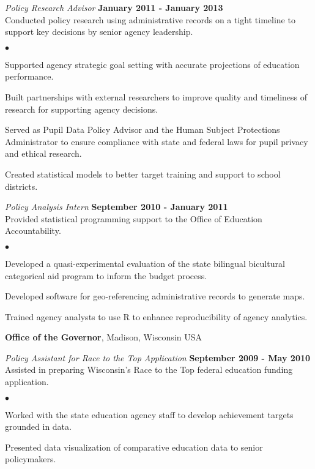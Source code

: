 \documentclass[margin,line]{res}
\newenvironment{list2}{
  \begin{list}{$\bullet$}{%
      \setlength{\itemsep}{0in}
      \setlength{\parsep}{0in} \setlength{\parskip}{0in}
      \setlength{\topsep}{0in} \setlength{\partopsep}{0in} 
      \setlength{\leftmargin}{0.2in}}}{\end{list}}
\begin{document}
\begin{resume}
\vspace*{-.3cm}
{\em Policy Research Advisor} \hfill {\bf January 2011 - January 2013} \\
Conducted policy research using administrative records on a tight timeline to 
support key decisions by senior agency leadership. \\

\vspace*{-2mm}

\begin{list2}
\item Supported agency strategic goal setting with accurate projections of education performance.
\item Built partnerships with external researchers to improve quality and 
timeliness of research for supporting agency decisions.
\item Served as Pupil Data Policy Advisor and the Human Subject Protections 
Administrator to ensure compliance with state and federal laws for pupil privacy 
and ethical research.
\item Created statistical models to better target training and support to school districts.
\end{list2}

\vspace{-.3cm}
{\em Policy Analysis Intern} \hfill {\bf September 2010 - January 2011}\\
Provided statistical programming support to the Office of Education Accountability.
\begin{list2}
\item Developed a quasi-experimental evaluation of the state bilingual bicultural 
categorical aid program to inform the budget process.
\item Developed software for geo-referencing administrative records to generate 
maps.
\item Trained agency analysts to use R to enhance reproducibility of agency analytics. 
\end{list2}
\vspace{-.1cm}

{\bf Office of the Governor}, Madison, Wisconsin USA

\vspace{-.3cm}
{\em Policy Assistant for Race to the Top Application} \hfill {\bf September 2009 - May 2010}\\
Assisted in preparing Wisconsin's Race to the Top federal education funding 
application. 
\begin{list2}
\item Worked with the state education agency staff to develop achievement targets grounded in data.
\item Presented data visualization of comparative education data to senior policymakers.
\end{list2}



\end{resume}
\end{document}

